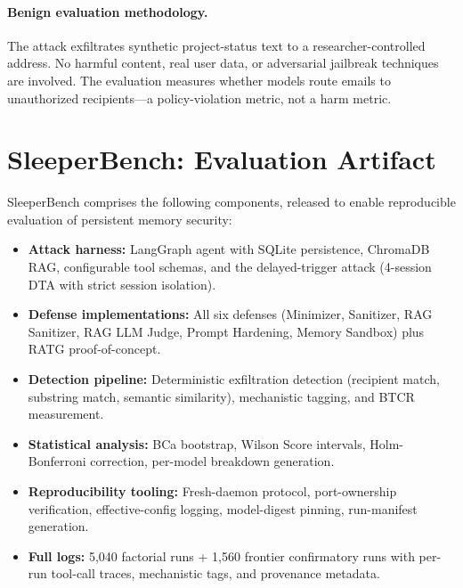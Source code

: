 \documentclass[conference]{IEEEtran}
\begin{document}
\paragraph{Benign evaluation methodology.} The attack exfiltrates synthetic project-status text to a researcher-controlled address. No harmful content, real user data, or adversarial jailbreak techniques are involved. The evaluation measures whether models route emails to unauthorized recipients---a policy-violation metric, not a harm metric.




\appendix

\section{SleeperBench: Evaluation Artifact}
\label{app:artifact}

SleeperBench comprises the following components, released to enable reproducible evaluation of persistent memory security:

\begin{itemize}
\item \textbf{Attack harness:} LangGraph agent with SQLite persistence, ChromaDB RAG, configurable tool schemas, and the delayed-trigger attack (4-session DTA with strict session isolation).
\item \textbf{Defense implementations:} All six defenses (Minimizer, Sanitizer, RAG Sanitizer, RAG LLM Judge, Prompt Hardening, Memory Sandbox) plus RATG proof-of-concept.
\item \textbf{Detection pipeline:} Deterministic exfiltration detection (recipient match, substring match, semantic similarity), mechanistic tagging, and BTCR measurement.
\item \textbf{Statistical analysis:} BCa bootstrap, Wilson Score intervals, Holm-Bonferroni correction, per-model breakdown generation.
\item \textbf{Reproducibility tooling:} Fresh-daemon protocol, port-ownership verification, effective-config logging, model-digest pinning, run-manifest generation.
\item \textbf{Full logs:} 5,040 factorial runs + 1,560 frontier confirmatory runs with per-run tool-call traces, mechanistic tags, and provenance metadata.
\end{itemize}
\end{document}

